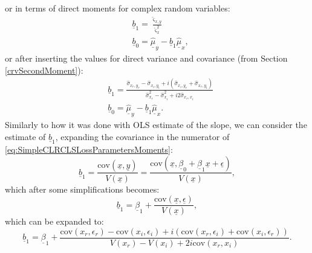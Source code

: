 \documentclass[
]{book}
\begin{document}
or in terms of direct moments for complex random variables:
\begin{equation}
    \begin{aligned}
        & \underline{b}_1 = \frac{\hat{\varsigma}_{x,y}}{\hat{\varsigma}_x^2} \\
        & \underline{b}_0 = \underline{\hat{\mu}}_{y} - \underline{b}_1 \underline{\hat{\mu}}_{x} ,
    \end{aligned}
    \label{eq:SimpleCLRCLSLossParametersMoments}
\end{equation}
or after inserting the values for direct variance and covariance (from Section \ref{crvSecondMoment}):
\begin{equation}
    \begin{aligned}
        & \underline{b}_1 = \frac{\hat{\sigma}_{x_r, y_r} - \hat{\sigma}_{x_i, y_i} + i (\hat{\sigma}_{x_i, y_r} + \hat{\sigma}_{x_r, y_i})}{\hat{\sigma}_{x_r}^2 - \hat{\sigma}_{x_i}^2 + i2 \hat{\sigma}_{x_r,x_i}} \\
        & \underline{b}_0 = \underline{\hat{\mu}}_{y} - \underline{b}_1 \underline{\hat{\mu}}_{x} .
    \end{aligned}
    \label{eq:SimpleCLRCLSLossParametersMomentsExpanded}
\end{equation}
Similarly to how it was done with OLS estimate of the slope, we can consider the estimate of \(\underline{b}_1\), expanding the covariance in the numerator of \eqref{eq:SimpleCLRCLSLossParametersMoments}:
\begin{equation}
        \underline{b}_1 = \frac{\mathrm{cov}(\underline{x},\underline{y})}{V(\underline{x})} = \frac{\mathrm{cov}(\underline{x},\underline{\beta}_0 + \underline{\beta}_1 \underline{x} + \underline{\epsilon})}{V(\underline{x})},
    \label{eq:SimpleCLRCLSb1Expansion01}
\end{equation}
which after some simplifications becomes:
\begin{equation}
        \underline{b}_1 = \underline{\beta}_1 + \frac{\mathrm{cov}(\underline{x}, \underline{\epsilon})}{V(\underline{x})} ,
    \label{eq:SimpleCLRCLSb1Expansion02}
\end{equation}
which can be expanded to:
\begin{equation}
    \underline{b}_1 = \underline{\beta}_1 + \frac{\mathrm{cov}(x_r, \epsilon_r) - \mathrm{cov}(x_i, \epsilon_i) + i (\mathrm{cov}(x_r, \epsilon_i) + \mathrm{cov}(x_i, \epsilon_r))}{V(x_r) - V(x_i) + 2i \mathrm{cov}(x_r, x_i)} . 
    \label{eq:SimpleCLRCLSb1Expansion03}
\end{equation}
\end{document}
